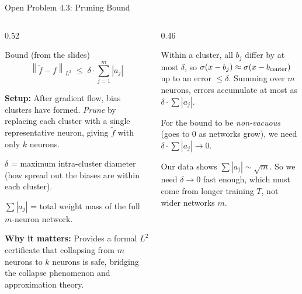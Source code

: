 \documentclass[aspectratio=169, 10pt]{beamer}
\newcommand{\ftilde}{\tilde{f}}
\newcommand{\norm}[1]{\left\|#1\right\|}
\newcommand{\abs}[1]{\left|#1\right|}
\begin{document}
\begin{frame}{Open Problem 4.3: Pruning Bound}
  \begin{columns}[T]
    \begin{column}{0.52\textwidth}
      \begin{block}{Bound (from the slides)}
        \[
          \norm{\ftilde - f}_{L^2}
          \;\leq\;
          \delta \cdot \sum_{j=1}^{m} \abs{a_j}
        \]
      \end{block}

      \vspace{0.4em}
      \small
      \textbf{Setup:} After gradient flow, bias clusters
      have formed. \emph{Prune} by replacing each cluster
      with a single representative neuron, giving
      $\ftilde$ with only $k$ neurons.

      \vspace{0.3em}
      \textbf{$\delta$} = maximum intra-cluster diameter
      (how spread out the biases are within each cluster).

      \vspace{0.3em}
      \textbf{$\sum|a_j|$} = total weight mass of the
      full $m$-neuron network.

      \vspace{0.3em}
      \textbf{Why it matters:} Provides a formal $L^2$
      certificate that collapsing from $m$ neurons to
      $k$ neurons is safe, bridging the
      collapse phenomenon and approximation theory.
    \end{column}
    \begin{column}{0.46\textwidth}
      \begin{tcolorbox}[slideboxA, title={Why the bound holds}]
        \small
        Within a cluster, all $b_j$ differ by at most
        $\delta$, so $\sigma(x - b_j) \approx
        \sigma(x - b_{\rm center})$ up to an error $\leq \delta$.
        Summing over $m$ neurons, errors accumulate
        at most as $\delta \cdot \sum|a_j|$.
      \end{tcolorbox}
      \vspace{0.3em}
      \begin{tcolorbox}[slideboxB, title={The challenge}]
        \small
        For the bound to be \emph{non-vacuous}
        (goes to 0 as networks grow), we need
        $\delta \cdot \sum|a_j| \to 0$.

        \vspace{4pt}
        Our data shows $\sum|a_j| \sim \sqrt{m}$.
        So we need $\delta \to 0$ fast enough,
        which must come from longer training $T$,
        not wider networks $m$.
      \end{tcolorbox}
    \end{column}
  \end{columns}
\end{frame}
\end{document}
